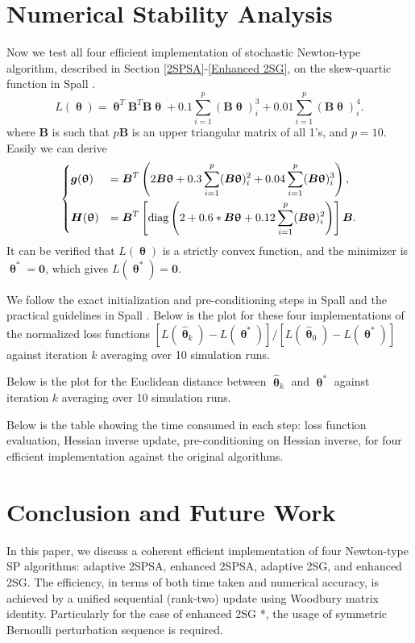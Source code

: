 \documentclass[conference]{IEEEtran} \ifCLASSINFOpdf
\newcommand{\htheta}{\bm{\hat{\uptheta}}}
\begin{document}
\section{Numerical Stability Analysis} Now we test all four
efficient implementation of stochastic Newton-type algorithm,
described in Section \ref{2SPSA}-\ref{Enhanced 2SG}, on the
skew-quartic function in Spall \cite{Spall2009}.
\begin{equation*}
  L(\bm{\uptheta})=\bm{\uptheta}^{T}\bm{B}^{T}\bm{B}\bm{\uptheta}+0.1
  \sum_{i=1}^{p} (\bm{B}\bm{\uptheta})_i^3 +0.01 \sum_{i=1}^{p}
  (\bm{B}\bm{\uptheta})_i^4.
\end{equation*} where $\bm{B}$ is such that $p\bm{B}$ is an
upper triangular matrix of all 1's, and $p=10$. Easily we can derive
\begin{equation}
  \begin{dcases} \bm{g}(\bm{\uptheta})&=\bm{B}^{T}\left(
      2\bm{B}\bm{\uptheta}+0.3 \sum_{i=1}^{p}(\bm{B}\bm{\uptheta})_i^2 +0.04\sum_{i=1}^{p}(\bm{B}\bm{\uptheta})_i^3\right),\\
    \bm{H}(\bm{\uptheta})&=\bm{B}^{T}\left[\text{diag}\left(2+0.6*\bm{B}\bm{\uptheta}+0.12\sum_{i=1}^{p}(\bm{B}\bm{\uptheta})_i^2\right)\right]\bm{B}.\\
  \end{dcases}
\end{equation} It can be verified that $L(\bm{\uptheta})$ is a
strictly convex function, and the minimizer is
$\bm{\uptheta}^{*}=\bm{0}$, which gives $L(\bm{\uptheta}^{*})=\bm{0}$.

We follow the exact initialization and pre-conditioning steps
in Spall \cite{Spall2009} and the practical guidelines in Spall
\cite{Spall2000}. Below is the plot for these four implementations of
the normalized loss functions
$[L(\htheta_k)-L(\bm{\uptheta}^{*})]/[L(\htheta_0)-L(\bm{\uptheta}^{*})]$
against iteration $k$ averaging over 10 simulation runs.


Below is the plot for the Euclidean distance between
$\htheta_k$ and $\bm{\uptheta}^{*}$ against iteration $k$ averaging
over 10 simulation runs.

Below is the table showing the time consumed in each step:
loss function evaluation, Hessian inverse update, pre-conditioning on
Hessian inverse, for four efficient implementation against the
original algorithms.

\section{Conclusion and Future Work} In this paper, we discuss
a coherent efficient implementation of four Newton-type SP algorithms:
adaptive 2SPSA, enhanced 2SPSA, adaptive 2SG, and enhanced 2SG. The
efficiency, in terms of both time taken and numerical accuracy, is
achieved by a unified sequential (rank-two) update using Woodbury
matrix identity. Particularly for the case of enhanced 2SG *, the
usage of symmetric Bernoulli perturbation sequence is required.
\end{document}
